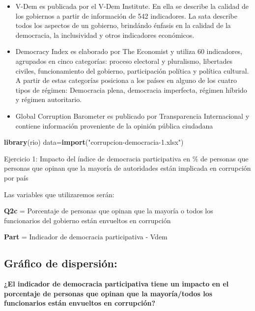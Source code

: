 \documentclass[
]{article}
\newenvironment{Shaded}{\begin{snugshade}}{\end{snugshade}}
\newcommand{\FunctionTok}[1]{\textcolor[rgb]{0.13,0.29,0.53}{\textbf{#1}}}
\newcommand{\NormalTok}[1]{#1}
\newcommand{\OtherTok}[1]{\textcolor[rgb]{0.56,0.35,0.01}{#1}}
\newcommand{\StringTok}[1]{\textcolor[rgb]{0.31,0.60,0.02}{#1}}
\begin{document}
\begin{itemize}
\item
  V-Dem es publicada por el V-Dem Institute. En ella se describe la
  calidad de los gobiernos a partir de información de 542 indicadores.
  La sata describe todos los aspectos de un gobierno, brindándo énfasis
  en la calidad de la democracia, la inclusividad y otros indicadores
  económicos.
\item
  Democracy Index es elaborado por The Economist y utiliza 60
  indicadores, agrupados en cinco categorías: proceso electoral y
  pluralismo, libertades civiles, funcionamiento del gobierno,
  participación política y política cultural. A partir de estas
  categorías posiciona a los países en alguno de los cuatro tipos de
  régimen: Democracia plena, democracia imperfecta, régimen híbrido y
  régimen autoritario.
\item
  Global Corruption Barometer es publicado por Transparencia
  Internacional y contiene información proveniente de la opinión pública
  ciudadana
\end{itemize}

\begin{Shaded}
\begin{Highlighting}[]
\FunctionTok{library}\NormalTok{(rio)}
\NormalTok{data}\OtherTok{=}\FunctionTok{import}\NormalTok{(}\StringTok{"corrupcion{-}democracia{-}1.xlsx"}\NormalTok{)}
\end{Highlighting}
\end{Shaded}

Ejercicio 1: Impacto del índice de democracia participativa en \% de
personas que personas que opinan que la mayoría de autoridades están
implicada en corrupción por país

Las variables que utilizaremos serán:

\textbf{Q2c} = Porcentaje de personas que opinan que la mayoría o todos
los funcionarios del gobierno están envueltos en corrupción

\textbf{Part} = Indicador de democracia participativa - Vdem

\hypertarget{gruxe1fico-de-dispersiuxf3n}{%
\subsection{Gráfico de dispersión:}\label{gruxe1fico-de-dispersiuxf3n}}

\textbf{¿El indicador de democracia participativa tiene un impacto en el
porcentaje de personas que opinan que la mayoría/todos los funcionarios
están envueltos en corrupción?}
\end{document}

